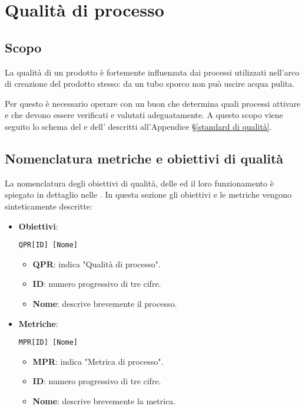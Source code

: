 \section{Qualità di processo}\label{qualità di processo}

\subsection{Scopo}
La qualità di un prodotto è fortemente influenzata dai processi utilizzati nell'arco di creazione del prodotto stesso: da un tubo sporco non può uscire acqua pulita.

Per questo è necessario operare con un buon  che
determina quali processi attivare e che devono essere verificati e valutati adeguatamente. A questo scopo viene seguito lo schema del  e dell' descritti all'Appendice \S\ref{standard di qualità}.


\subsection{Nomenclatura metriche e obiettivi di qualità}  \label{nomenclatura}
La nomenclatura degli obiettivi di qualità, delle  ed il loro funzionamento è spiegato in dettaglio nelle \NdP. In questa sezione gli obiettivi e le metriche vengono sinteticamente descritte:

	\begin{itemize}
		\item \textbf{Obiettivi}: 
		
		\begin{center}
			\texttt{QPR[ID] [Nome]}
		\end{center} 
		
		\begin{itemize}
			\item \textbf{QPR}: indica "Qualità di processo".
			\item \textbf{ID}: numero progressivo di tre cifre.
			\item \textbf{Nome}: descrive brevemente il processo.
		\end{itemize}
		
		\item \textbf{Metriche}:
		
		\begin{center}
			\texttt{MPR[ID] [Nome]}
		\end{center}
		
		\begin{itemize}
			\item \textbf{MPR}: indica "Metrica di processo".
			\item \textbf{ID}: numero progressivo di tre cifre.
			\item \textbf{Nome}: descrive brevemente la metrica.
		\end{itemize}
		
	\end{itemize}




